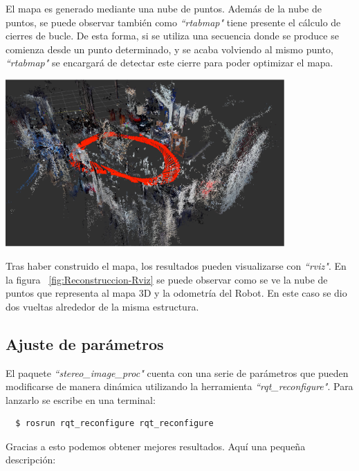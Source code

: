 El mapa es generado mediante una nube de puntos. Además de la nube de puntos, se
puede observar también como \textit{``rtabmap"} tiene presente el cálculo de
cierres de bucle. De esta forma, si se utiliza una secuencia donde se produce se
comienza desde un punto determinado, y se acaba volviendo al mismo punto,
\textit{``rtabmap"} se encargará de detectar este cierre para poder optimizar el
mapa.

\begin{minipage}{\linewidth}
    \centering
    \includegraphics[width=0.8\textwidth]{images/cap4/rviz.eps}
    \label{fig:Reconstruccion-Rviz}
\end{minipage}

Tras haber construido el mapa, los resultados pueden visualizarse con
\textit{``rviz"}. En la figura ~\ref{fig:Reconstruccion-Rviz} se puede observar
como se ve la nube de puntos que representa al mapa 3D y la odometría del Robot.
En este caso se dio dos vueltas alrededor de la misma estructura.

\subsection{Ajuste de parámetros}
El paquete \textit{``stereo\_image\_proc"} cuenta con una serie de parámetros
que pueden modificarse de manera dinámica utilizando la herramienta
\textit{``rqt\_reconfigure"}. Para lanzarlo se escribe en una terminal:
\\
\begin{lstlisting}
  $ rosrun rqt_reconfigure rqt_reconfigure
\end{lstlisting}

Gracias a esto podemos obtener mejores resultados. Aquí una pequeña descripción:

